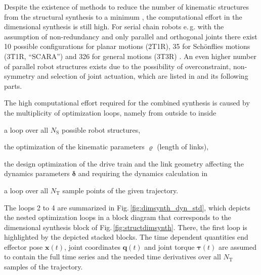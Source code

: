 \documentclass{svproc}
\newcommand{\bm}[1]{\boldsymbol{#1}}
\begin{document}

Despite the existence of methods to reduce the number of kinematic structures from the structural synthesis to a minimum \cite{RamirezKotOrt2015}, the computational effort in the dimensional synthesis is still high.
For serial chain robots e.\,g. with the assumption of non-redundancy and only parallel and orthogonal joints there exist 10 possible configurations for planar motions (2T1R), 35 for Schönflies motions (3T1R, ``SCARA'') and 326 for general motions (3T3R) \cite{RamirezKotOrt2015,RamirezKotOrt2017}.
An even higher number of parallel robot structures exists due to the possibility of overconstraint, non-symmetry and selection of joint actuation, which are listed in \cite{Gogu2008} and its following parts.

The high computational effort required for the combined synthesis is caused by the multiplicity of optimization loops, namely from outside to inside
\begin{compactenum}
\item a loop over all $N_{\mathrm{S}}$ possible robot structures,
\item the optimization of the kinematic parameters $\bm{\varrho}$ (length of links),
\item the design optimization of the drive train and the link geometry affecting the dynamics parameters $\bm{\delta}$ and requiring the dynamics calculation in 
\item a loop over all $N_\mathrm{T}$ sample points of the given trajectory.
\end{compactenum}

The loops 2 to 4 are summarized in Fig.\,\ref{fig:dimsynth_dyn_std}, which depicts the nested optimization loops in a block diagram that corresponds to the dimensional synthesis block of Fig.\,\ref{fig:structdimsynth}.
There, the first loop is highlighted by the depicted stacked blocks.
The time dependent quantities end effector pose $\bm{x}(t)$, joint coordinates $\bm{q}(t)$ and joint torque $\bm{\tau}(t)$ are assumed to contain the full time series and the needed time derivatives over all $N_\mathrm{T}$ samples of the trajectory.
\end{document}
